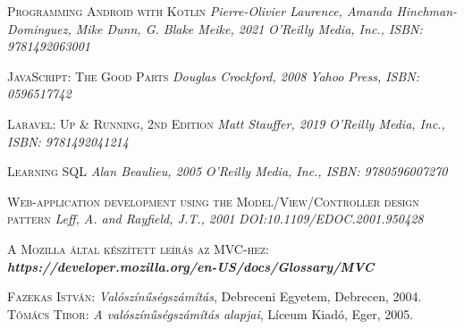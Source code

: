 \documentclass[
]{thesis-ekf}
\theoremstyle{definition}
\theoremstyle{remark}
\begin{document}
\begin{thebibliography}{2}
\textsc{Programming Android with Kotlin}
\newline
\emph{Pierre-Olivier Laurence, Amanda Hinchman-Dominguez, Mike Dunn, G. Blake Meike,  2021}
\emph{O'Reilly Media, Inc., ISBN: 9781492063001}

\textsc{JavaScript: The Good Parts}
\newline
\emph{Douglas Crockford, 2008}
\emph{Yahoo Press, ISBN: 0596517742}

\textsc{Laravel: Up \& Running, 2nd Edition}
\newline
\emph{Matt Stauffer, 2019}
\emph{O'Reilly Media, Inc., ISBN: 9781492041214}

\textsc{Learning SQL}
\newline
\emph{Alan Beaulieu, 2005}
\emph{O'Reilly Media, Inc., ISBN: 9780596007270}

\textsc{Web-application development using the Model/View/Controller design pattern}
\newline
\emph{Leff, A. and Rayfield, J.T., 2001}
\emph{DOI:10.1109/EDOC.2001.950428}

\textsc{A Mozilla által készített leírás az MVC-hez:}
\newline
\emph{\bf{https://developer.mozilla.org/en-US/docs/Glossary/MVC}}

\textsc{Fazekas István}: \emph{Valószínűségszámítás}, Debreceni Egyetem, Debrecen, 2004.
\textsc{Tómács Tibor}: \emph{A valószínűségszámítás alapjai}, Líceum Kiadó, Eger, 2005.
\end{thebibliography}

%
\end{document}
